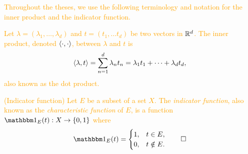 \documentclass[../thesis.tex]{subfiles}
\begin{document}
\textcolor{orange}{  %
Throughout the theses, we use the following terminology and notation for the inner product and the indicator function.
\begin{definition}\label{def:dot_prod}
    Let $\lambda=(\lambda_1, \dots, \lambda_d)$ and $t=(t_1,\dots t_d)$ be two vectors in $\mathbb{R}^d$. The inner product, denoted $\langle\cdot, \cdot\rangle$, between $\lambda$ and $t$ is
    \begin{equation*}
        \left \langle \lambda,t \right \rangle = \sum_{n=1}^d \lambda_n t_n= \lambda_1 t_1 + \dots + \lambda_d t_d,
    \end{equation*}
    also known as the dot product. 
\end{definition}
} %

\textcolor{orange}{  %
\begin{definition}(Indicator function)\label{def:indicator}
    Let $E$ be a subset of a set $X$. The \emph{indicator function}, also known as the \emph{characteristic function} of $E$, is a function $\indicator{E}{t}: X \rightarrow \braq{0,1}$ where
    \begin{equation*}
        \indicator{E}{t}  = 
        \begin{cases} 
            1, &  t\in E,\\
            0, &  t \notin E.
        \end{cases}
        \qedhere
    \end{equation*}
\end{definition}
} %
\end{document}
